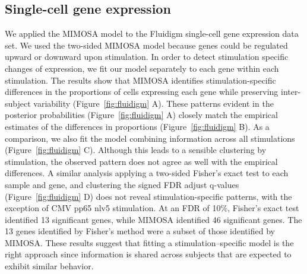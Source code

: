 \documentclass[12pt,oupdraft]{biostatistics}
\begin{document}
\subsection{Single-cell gene expression}
We applied the MIMOSA model to the Fluidigm single-cell gene expression data set. We used the two-sided MIMOSA model because genes could be regulated upward or downward upon stimulation. In order to detect stimulation specific changes of expression, we fit our model separately to each gene within each stimulation. The results show that MIMOSA identifies stimulation-specific differences in the proportions of cells expressing each gene while preserving inter-subject variability (Figure~\ref{fig:fluidigm} A). These patterns evident in the  posterior probabilities (Figure~\ref{fig:fluidigm} A) closely match the empirical estimates of the differences in proportions (Figure~\ref{fig:fluidigm} B). As a comparison, we also fit the model combining information across all stimulations (Figure~\ref{fig:fluidigm} C). Although this leads to a sensible clustering by stimulation, the observed pattern does not agree as well with the empirical differences. A similar analysis applying a two-sided Fisher's exact test to each sample and gene, and clustering the signed FDR adjust q-values (Figure~\ref{fig:fluidigm} D) does not reveal stimulation-specific patterns, with the exception of CMV pp65 nlv5 stimulation. At an FDR of 10\%, Fisher's exact test identified 13 significant genes, while MIMOSA identified 46 significant genes. The 13 genes identified by Fisher's method were a subset of those identified by MIMOSA. These results suggest that fitting a stimulation--specific model is the right approach since information is shared across subjects that are expected to exhibit similar behavior.
\end{document}
